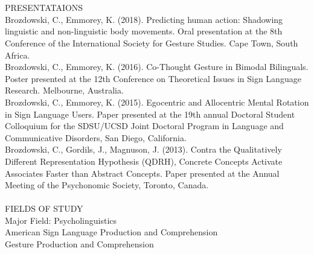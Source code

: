            \\~\\
        \noindent PRESENTATAIONS \\ \vspace{\baselineskip}
            \parindent Brozdowski, C., Emmorey, K. (2018). Predicting human action: Shadowing linguistic and non-linguistic body movements. Oral presentation at the 8th Conference of the International Society for Gesture Studies. Cape Town, South Africa. \\ [1ex] 
            \parindent Brozdowski, C., Emmorey, K. (2016). Co-Thought Gesture in Bimodal Bilinguals. Poster presented at the 12th Conference on Theoretical Issues in Sign Language Research. Melbourne, Australia. \\ [1ex] 
            \parindent Brozdowski, C., Emmorey, K. (2015). Egocentric and Allocentric Mental Rotation in Sign Language Users. Paper presented at the 19th annual Doctoral Student Colloquium for the SDSU/UCSD Joint Doctoral Program in Language and Communicative Disorders, San Diego, California. \\ [1ex] 
            \parindent Brozdowski, C., Gordils, J., Magnuson, J. (2013). Contra the Qualitatively Different Representation Hypothesis (QDRH), Concrete Concepts Activate Associates Faster than Abstract Concepts. Paper presented at the Annual Meeting of the Psychonomic Society, Toronto, Canada. 
            \\~\\
        \noindent FIELDS OF STUDY \\ \vspace{\baselineskip}
            \indent Major Field: Psycholinguistics \\
            \indent\indent American Sign Language Production and Comprehension \\
            \indent\indent Gesture Production and Comprehension \\

